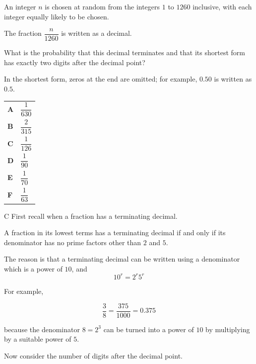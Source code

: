 \documentclass[11pt,a4paper]{article}
\begin{document}
\begin{enumerate}[label=\textbf{\arabic*.},leftmargin=*,itemsep=0pt,start=11]
\questionitem[Number]
An integer $n$ is chosen at random from the integers $1$ to $1260$ inclusive, with each integer equally likely to be chosen. 

The fraction $\dfrac{n}{1260}$ is written as a decimal.

What is the probability that this decimal terminates and that its shortest form has exactly two digits after the decimal point?

In the shortest form, zeros at the end are omitted; for example, $0.50$ is written as $0.5$.

\par\vspace*{12pt}
\begin{tabularx}{\linewidth}{@{}>{\bfseries}l Y@{}}
A &
$\dfrac{1}{630}$
\\[0.8em]
B &
$\dfrac{2}{315}$
\\[0.8em]
C &
$\dfrac{1}{126}$
\\[0.8em]
D &
$\dfrac{1}{90}$
\\[0.8em]
E &
$\dfrac{1}{70}$
\\[0.8em]
F &
$\dfrac{1}{63}$
\\
\end{tabularx}

\begin{djsSolution}{C}
First recall when a fraction has a terminating decimal.

A fraction in its lowest terms has a terminating decimal if and only if its denominator has no prime factors other than $2$ and $5$.

The reason is that a terminating decimal can be written using a denominator which is a power of $10$, and
\[
10^r=2^r5^r
\]

For example,

\[
\frac{3}{8}
=
\frac{375}{1000}
=
0.375
\]

because the denominator $8=2^3$ can be turned into a power of $10$ by multiplying by a suitable power of $5$.

Now consider the number of digits after the decimal point.


\end{djsSolution}
\end{enumerate}
\end{document}
